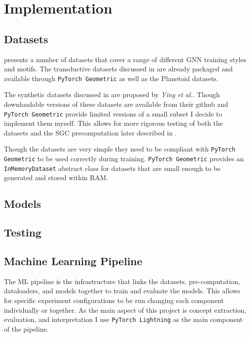 \chapter{Implementation}

\section{Datasets}
\label{sec:datasets-imp}
 presents a number of datasets that cover a range of different GNN training styles and motifs.
The transductive datasets discussed in  are already packaged and available through \texttt{PyTorch Geometric}\cite{Fey/Lenssen/2019} as well as the Planetoid\cite{planetoid}\cite{citation} datasets.

The synthetic datasets discussed in  are proposed by \textit{Ying et al.}\cite{ying2019gnnexplainer}.
Though downloadable versions of these datasets are available from their github and \texttt{PyTorch Geometric} provide limited versions of a small subset I decide to implement them myself.
This allows for more rigorous testing of both the datasets and the SGC precomputation later described in .

Though the datasets are very simple they need to be compliant with \texttt{PyTorch Geometric} to be used correctly during training.
\texttt{PyTorch Geometric} provides an \texttt{InMemoryDataset} abstract class for datasets that are small enough to be generated and stored within RAM.


\section{Models}
\label{sec:models}

\section{Testing}
\label{sec:testing-imp}

\section{Machine Learning Pipeline}

The ML pipeline is the infrastructure that links the datasets, pre-computation, dataloaders, and models together to train and evaluate the models.
This allows for specific experiment configurations to be run changing each component individually or together.
As the main aspect of this project is concept extraction, evaluation, and interpretation I use \texttt{PyTorch Lightning} as the main component of the pipeline.

